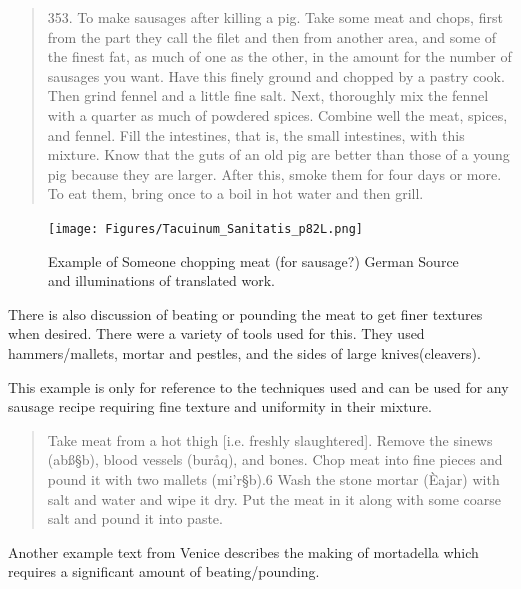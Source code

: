\documentclass[letterpaper,11pt,leqno]{article}
\begin{document}
 \begin{quote}
 	353. To make sausages after killing a pig. Take some meat and chops, first from the part they call the filet and then from another area, and some of the finest fat, as much of one as the other, in the amount for the number of sausages you want. Have this finely ground and chopped by a pastry cook. Then grind fennel and a little fine salt. Next, thoroughly mix the fennel with a quarter as much of powdered spices. Combine well the meat, spices, and fennel. Fill the intestines, that is, the small intestines, with this mixture. Know that the guts of an old pig are better than those of a young pig because they are larger. After this, smoke them for four days or more. To eat them, bring once to a boil in hot water and then grill. \citep{goodWife}
 \end{quote} 
 
 \begin{figure}[p]
 	\centering
 	\texttt{[image: Figures/Tacuinum\_Sanitatis\_p82L.png]}
 	\caption{Example of Someone chopping meat (for sausage?) German Source and illuminations of translated work.\citep{TacSan}}
 	\label{plot}
 \end{figure}
 
 There is also discussion of beating or pounding the meat to get finer textures when desired. There were a variety of tools used for this. They used hammers/mallets, mortar and pestles, and the sides of large knives(cleavers). 
 
 This example is only for reference to the techniques used and can be used for any sausage recipe requiring fine texture and uniformity in their mixture.
 
 \begin{quote}
 	Take meat from a hot thigh [i.e. freshly slaughtered]. Remove the sinews (abß§b), blood vessels (buråq), and bones. Chop meat into fine pieces and pound it with two mallets (mi'r§b).6 Wash the stone mortar (Èajar) with salt and water and wipe it dry. Put the meat in it along with some coarse salt and pound it into paste. \cite{al2007annals}
 \end{quote}
 
 Another example text from Venice describes the making of mortadella which requires a significant amount of beating/pounding.
 
\end{document}
